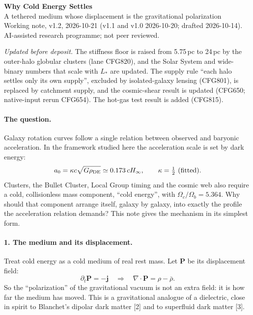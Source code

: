 \documentclass[10pt]{article}
\begin{document}
\begin{center}
{\Large\bfseries Why Cold Energy Settles}\\[3pt]
{\large A tethered medium whose displacement is the gravitational polarization}\\[5pt]
{\small Working note, v1.2, 2026-10-21 (v1.1 and v1.0 2026-10-20; drafted 2026-10-14). AI-assisted research programme; not peer reviewed.}
\end{center}
{\footnotesize\textit{Updated before deposit.} The stiffness floor is raised from 5.75\,pc to 24\,pc by the outer-halo globular clusters (lane CFG820), and the Solar System and wide-binary numbers that scale with $L_*$ are updated. The supply rule ``each halo settles only its own supply'', excluded by isolated-galaxy lensing (CFG801), is replaced by catchment supply, and the cosmic-shear result is updated (CFG650; native-input rerun CFG654). The hot-gas test result is added (CFG815).}

\paragraph{The question.} Galaxy rotation curves follow a single relation between observed and baryonic acceleration. In the framework studied here the acceleration scale is set by dark energy:
$$a_0=\kappa c\sqrt{G\rho_{\rm DE}}\simeq0.173\,cH_\infty,\qquad \kappa=\tfrac12\ \text{(fitted)}.$$
Clusters, the Bullet Cluster, Local Group timing and the cosmic web also require a cold, collisionless mass component, ``cold energy'', with $\Omega_c/\Omega_b=5.364$. Why should that component arrange itself, galaxy by galaxy, into exactly the profile the acceleration relation demands? This note gives the mechanism in its simplest form.

\paragraph{1. The medium and its displacement.} Treat cold energy as a cold medium of real rest mass. Let $\mathbf P$ be its displacement field:
$$\partial_t\mathbf P=-\mathbf j\quad\Longrightarrow\quad\nabla\!\cdot\!\mathbf P=\rho-\bar\rho.$$
So the ``polarization'' of the gravitational vacuum is not an extra field: it is how far the medium has moved. This is a gravitational analogue of a dielectric, close in spirit to Blanchet's dipolar dark matter [2] and to superfluid dark matter [3].
\end{document}
